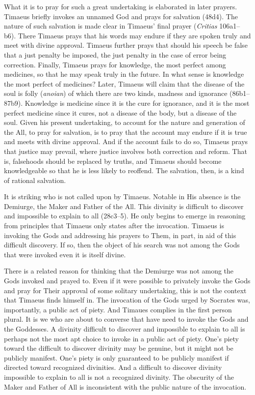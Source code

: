 What it is to pray for such a great undertaking is elaborated in later prayers. Timaeus briefly invokes an unnamed God and prays for salvation (48d4). The nature of such salvation is made clear in Timaeus' final prayer (\emph{Critias} 106a1–b6). There Timaeus prays that his words may endure if they are spoken truly and meet with divine approval. Timaeus further prays that should his speech be false that a just penalty be imposed, the just penalty in the case of error being correction. Finally, Timaeus prays for knowledge, the most perfect among medicines, so that he may speak truly in the future. In what sense is knowledge the most perfect of medicines? Later, Timaeus will claim that the disease of the soul is folly (\emph{anoian}) of which there are two kinds, madness and ignorance (86b1–87b9). Knowledge is medicine since it is the cure for ignorance, and it is the most perfect medicine since it cures, not a disease of the body, but a disease of the soul. Given his present undertaking, to account for the nature and generation of the All, to pray for salvation, is to pray that the account may endure if it is true and meets with divine approval. And if the account fails to do so, Timaeus prays that justice may prevail, where justice involves both correction and reform. That is, falsehoods should be replaced by truths, and Timaeus should become knowledgeable so that he is less likely to reoffend. The salvation, then, is a kind of rational salvation.

It is striking who is not called upon by Timaeus. Notable in His absence is the Demiurge, the Maker and Father of the All. This divinity is difficult to discover and impossible to explain to all (28c3–5). He only begins to emerge in reasoning from principles that Timaeus only states after the invocation. Timaeus is invoking the Gods and addressing his prayers to Them, in part, in aid of this difficult discovery. If so, then the object of his search was not among the Gods that were invoked even it is itself divine.

There is a related reason for thinking that the Demiurge was not among the Gods invoked and prayed to. Even if it were possible to privately invoke the Gods and pray for Their approval of some solitary undertaking, this is not the context that Timaeus finds himself in. The invocation of the Gods urged by Socrates was, importantly, a public act of piety. And Timaues complies in the first person plural. It is we who are about to converse that have need to invoke the Gods and the Goddesses. A divinity difficult to discover and impossible to explain to all is perhaps not the most apt choice to invoke in a public act of piety. One's piety toward the difficult to discover divinity may be genuine, but it might not be publicly manifest. One's piety is only guaranteed to be publicly manifest if directed toward recognized divinities. And a difficult to discover divinity impossible to explain to all is not a recognized divinity. The obscurity of the Maker and Father of All is inconsistent with the public nature of the invocation.

